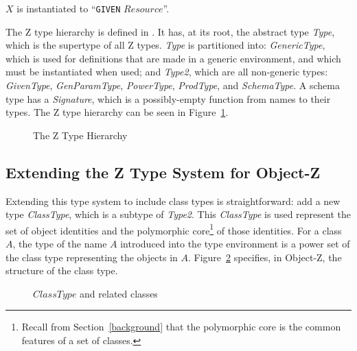 $X$ is instantiated to ``{\tt GIVEN} $Resource$''.

The Z type hierarchy is defined in . It has, at its root,
the abstract type {\em Type}, which is the supertype of all Z
types. {\em Type} is partitioned into: {\em GenericType}, which is
used for definitions that are made in a generic environment, and which
must be instantiated when used; and {\em Type2}, which are all
non-generic types: {\em GivenType}, {\em GenParamType}, {\em
PowerType}, {\em ProdType}, and {\em SchemaType}. A schema type has a
{\em Signature}, which is a possibly-empty function from names to
their types. The Z type hierarchy can be seen in Figure~\ref{z-types}.

\def\epsfsize#1#2{0.7#1}
\begin{figure}
\begin{center}
\end{center}
\caption{The Z Type Hierarchy}
\label{z-types}
\end{figure}
\def\epsfsize#1#2{\epsfxsize}

\subsection{Extending the Z Type System for Object-Z}

Extending this type system to include class types is straightforward:
add a new type {\em ClassType}, which is a subtype of {\em
Type2}. This {\em ClassType} is used represent the set of object
identities and the polymorphic core\footnote{Recall from
Section~\ref{background} that the polymorphic core is the common
features of a set of classes.} of those identities. For a class $A$,
the type of the name $A$ introduced into the type environment is a
power set of the class type representing the objects in
$A$. Figure~\ref{ClassType.fig} specifies, in Object-Z, the structure of
the class type.

\begin{figure}[t]
 
\caption{$ClassType$ and related classes}
\label{ClassType.fig}
\end{figure}


